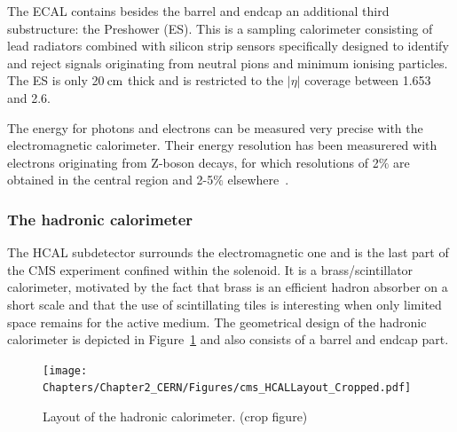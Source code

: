 The ECAL contains besides the barrel and endcap an additional third substructure: the Preshower (ES). This is a sampling calorimeter consisting of lead radiators combined with silicon strip sensors specifically designed to identify and reject signals originating from neutral pions and minimum ionising particles. %
The ES is only 20$\, \mathrm{cm}$ thick and is restricted to the $\vert \eta \vert$ coverage between 1.653 and 2.6. 

The energy for photons and electrons can be measured very precise with the electromagnetic calorimeter.
Their energy resolution has been measurered with electrons originating from Z-boson decays, for which resolutions of 2$\%$ are obtained in the central region and 2-5$\%$ elsewhere~\cite{ECALResolution}.

\subsubsection{The hadronic calorimeter}
The HCAL subdetector surrounds the electromagnetic one and is the last part of the CMS experiment confined within the solenoid.
It is a brass/scintillator calorimeter, motivated by the fact that brass is an efficient hadron absorber on a short scale and that the use of scintillating tiles is interesting when only limited space remains for the active medium. The geometrical design of the hadronic calorimeter is depicted in Figure~\ref{fig::HCAL} and also consists of a barrel and endcap part.
\begin{figure}[h!t]
 \centering
 \texttt{[image: Chapters/Chapter2\_CERN/Figures/cms\_HCALLayout\_Cropped.pdf]}
 \caption{Layout of the hadronic calorimeter. (crop figure)} \label{fig::HCAL}
\end{figure}

